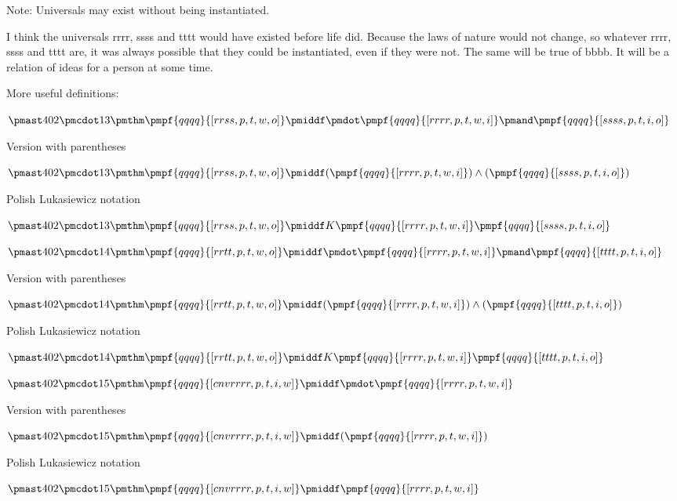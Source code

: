 \documentclass[12pt]{article}
\begin{document}
Note: Universals may exist without being instantiated.

I think the universals rrrr, ssss and tttt would have existed before life did. Because the laws of nature would not change, so whatever rrrr, ssss and tttt are, it was always possible that they could be instantiated, even if they were not. The same will be true of bbbb. It will be a relation of ideas for a person at some time.

More useful definitions:

$\pmast 402 \pmcdot 13 \pmthm \pmpf{qqqq}{[rrss, p, t, w, o]} \pmiddf \pmdot \pmpf{qqqq}{[rrrr, p, t, w, i]} \pmand \pmpf{qqqq}{[ssss, p, t, i, o]} $
 
 

Version with parentheses

$\pmast 402 \pmcdot 13 \pmthm \pmpf{qqqq}{[rrss, p, t, w, o]} \pmiddf  (  \pmpf{qqqq}{[rrrr, p, t, w, i]} ) \land ( \pmpf{qqqq}{[ssss, p, t, i, o]} )$


Polish Lukasiewicz notation

$\pmast 402 \pmcdot 13 \pmthm \pmpf{qqqq}{[rrss,   p,   t,   w,   o]}   \pmiddf     K   \pmpf{qqqq}{[rrrr,   p,   t,   w,   i]}   \pmpf{qqqq}{[ssss,   p,   t,   i,   o]}  $


$\pmast 402 \pmcdot 14 \pmthm \pmpf{qqqq}{[rrtt, p, t, w, o]} \pmiddf \pmdot \pmpf{qqqq}{[rrrr, p, t, w, i]} \pmand \pmpf{qqqq}{[tttt, p, t, i, o]} $
 
 

Version with parentheses

$\pmast 402 \pmcdot 14 \pmthm \pmpf{qqqq}{[rrtt, p, t, w, o]} \pmiddf  (  \pmpf{qqqq}{[rrrr, p, t, w, i]} ) \land ( \pmpf{qqqq}{[tttt, p, t, i, o]} )$


Polish Lukasiewicz notation

$\pmast 402 \pmcdot 14 \pmthm \pmpf{qqqq}{[rrtt,   p,   t,   w,   o]}   \pmiddf     K   \pmpf{qqqq}{[rrrr,   p,   t,   w,   i]}   \pmpf{qqqq}{[tttt,   p,   t,   i,   o]}  $


$\pmast 402 \pmcdot 15 \pmthm \pmpf{qqqq}{[cnvrrrr, p, t, i, w]} \pmiddf \pmdot \pmpf{qqqq}{[rrrr, p, t, w, i]} $
 
 

Version with parentheses

$\pmast 402 \pmcdot 15 \pmthm \pmpf{qqqq}{[cnvrrrr, p, t, i, w]} \pmiddf  (  \pmpf{qqqq}{[rrrr, p, t, w, i]} )$


Polish Lukasiewicz notation

$\pmast 402 \pmcdot 15 \pmthm \pmpf{qqqq}{[cnvrrrr,   p,   t,   i,   w]}   \pmiddf    \pmpf{qqqq}{[rrrr,   p,   t,   w,   i]}  $
\end{document}
